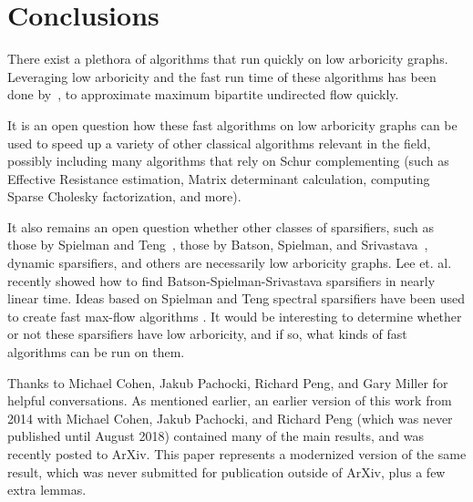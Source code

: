 \section{Conclusions}
There exist a plethora of algorithms that run quickly on low arboricity
graphs. Leveraging low arboricity and the fast run time of these
algorithms has been done by~\cite{AbrahamDKKP16}, to approximate maximum
bipartite undirected flow quickly.

It is an open question how these fast
algorithms on low arboricity graphs can be used to speed up a variety of
other classical algorithms relevant in the field, possibly including
many algorithms that rely on Schur complementing (such as Effective
Resistance estimation, Matrix determinant calculation, computing Sparse Cholesky factorization, and
more). 

It also remains an open question whether other classes of sparsifiers,
such as those by Spielman and Teng~\cite{SpielmanT04}, those by
Batson, Spielman, and Srivastava~\cite{BatsonSS09}, dynamic sparsifiers,
  and others are necessarily low arboricity graphs. Lee et. al. recently
  showed how to find Batson-Spielman-Srivastava sparsifiers in nearly
  linear time. Ideas based on Spielman and Teng spectral sparsifiers have been used to create
  fast max-flow algorithms . It would be
  interesting to determine whether or not these sparsifiers have low
  arboricity, and if so, what kinds of fast algorithms can be run on
  them.

Thanks to Michael Cohen, Jakub Pachocki, Richard Peng, and Gary Miller
for helpful conversations. As mentioned earlier, an earlier version of
this work from 2014 with Michael Cohen, Jakub Pachocki, and Richard Peng
(which was never published until August 2018) contained many 
of the main results, and was recently posted to
ArXiv. This paper represents a modernized version of the same result,
which was never submitted for publication outside of ArXiv, plus a few extra lemmas.
